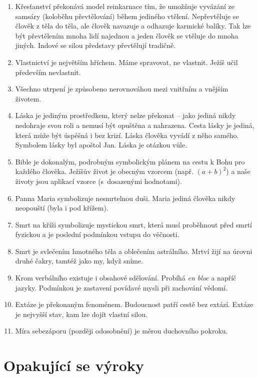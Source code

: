 \begin{enumerate}
{    Apoštolové symbolizují lidské vlastnosti.
  }
  \item{
    Křesťanství překonává model reinkarnace tím, že umožňuje vyvázání ze samsáry
    (koloběhu převtělování) během jediného vtělení.
    Nepřevtěluje se člověk z těla do těla, ale člověk navazuje a odhazuje karmické balíky.
    Tak lze být převtělením mnoha lidí najednou a jeden člověk se vtěluje do mnoha jiných.
    Indové se silou představy převtělují tradičně.
  }
  \item{
    Vlastnictví je největším hříchem.
    Máme spravovat, ne vlastnit.
    Ježíš učil především nevlastnit.
  }
  \item{
    Všechno utrpení je způsobeno nerovnováhou mezi vnitřním a vnějším životem.
  }
  \item{
    Láska je jediným prostředkem, který nelze překonat -- jako jediná nikdy nedohraje svou
    roli a nemusí být opuštěna a nahrazena.
    Cesta lásky je jediná, která může být úspěšná i bez krizí.
    Láska člověka vyvádí z něho samého.
    Symbolem lásky byl apoštol Jan.
    Láska je otázkou vůle.
  }
  \item{
    Bible je dokonalým, podrobným symbolickým plánem na cestu k Bohu pro každého člověka.
    Ježíšův život je obecným vzorcem (např. $(a + b)^2$) a naše životy jsou
    aplikací vzorce (s~dosazenými hodnotami).
  }
  \item{
    Panna Maria symbolizuje nesmrtelnou duši.
    Maria jediná člověka nikdy neopouští (byla i pod křížem).
  }
  \item{
    Smrt na kříži symbolizuje mystickou smrt, která musí proběhnout před smrtí fyzickou a je poslední podmínkou vstupu do věčnosti.
  }
  \item{
    Smrt je svlečením hmotného těla a oblečením astrálního.
    Mrtví žijí na úrovni druhé čakry, tamtéž jako my, když sníme.
  }
  \item{
    Krom verbálního existuje i obsahové sdělování.
    Probíhá \textit{en bloc} a napříč jazyky.
    Podmínkou je zastavení povídavé mysli při zachování vědomí.
  }
  \item{
    Extáze je překonaným fenoménem.
    Budoucnost patří cestě bez extází.
    Extáze je nejvyšší stav, kam lze dojít vlastní silou.
  }
  \item{
    Míra sebezáporu (později odosobnění) je měrou duchovního pokroku.
  }
\end{enumerate}

\section{Opakující se výroky}

